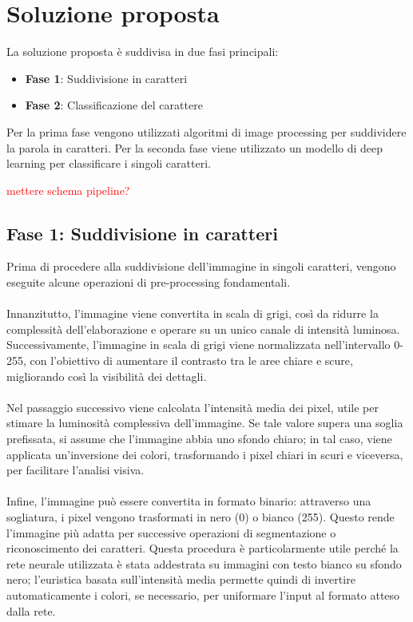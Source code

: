 \chapter{Soluzione proposta}

La soluzione proposta è suddivisa in due fasi principali:
\begin{itemize}
	\item \textbf{Fase 1}: Suddivisione in caratteri
	\item \textbf{Fase 2}: Classificazione del carattere
\end{itemize}

Per la prima fase vengono utilizzati algoritmi di image processing per suddividere la parola in caratteri. Per la seconda fase viene utilizzato un modello di deep learning per classificare i singoli caratteri.

\textcolor{red}{mettere schema pipeline?}

\section{Fase 1: Suddivisione in caratteri}

Prima di procedere alla suddivisione dell'immagine in singoli caratteri, vengono eseguite alcune operazioni di pre-processing fondamentali. \\ \\ Innanzitutto, l'immagine viene convertita in scala di grigi, così da ridurre la complessità dell'elaborazione e operare su un unico canale di intensità luminosa. Successivamente, l'immagine in scala di grigi viene normalizzata nell'intervallo 0-255, con l'obiettivo di aumentare il contrasto tra le aree chiare e scure, migliorando così la visibilità dei dettagli. \\ \\ Nel passaggio successivo viene calcolata l'intensità media dei pixel, utile per stimare la luminosità complessiva dell'immagine. Se tale valore supera una soglia prefissata, si assume che l'immagine abbia uno sfondo chiaro; in tal caso, viene applicata un'inversione dei colori, trasformando i pixel chiari in scuri e viceversa, per facilitare l'analisi visiva. \\ \\ Infine, l'immagine può essere convertita in formato binario: attraverso una sogliatura, i pixel vengono trasformati in nero (0) o bianco (255). Questo rende l'immagine più adatta per successive operazioni di segmentazione o riconoscimento dei caratteri. Questa procedura è particolarmente utile perché la rete neurale utilizzata è stata addestrata su immagini con testo bianco su sfondo nero; l'euristica basata sull'intensità media permette quindi di invertire automaticamente i colori, se necessario, per uniformare l'input al formato atteso dalla rete.
\newline

